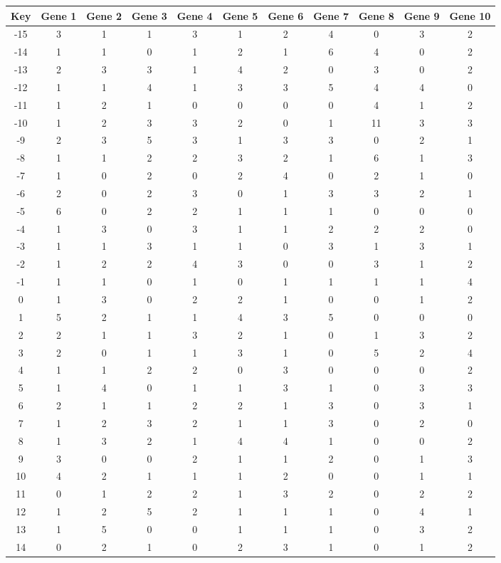 \begin{tabular}{|c|c|c|c|c|c|c|c|c|c|c|}
\hline
Key & Gene 1 & Gene 2 & Gene 3 & Gene 4 & Gene 5 & Gene 6 & Gene 7 & Gene 8 & Gene 9 & Gene 10 \\
\hline
-15 & 3 & 1 & 1 & 3 & 1 & 2 & 4 & 0 & 3 & 2 \\
-14 & 1 & 1 & 0 & 1 & 2 & 1 & 6 & 4 & 0 & 2 \\
-13 & 2 & 3 & 3 & 1 & 4 & 2 & 0 & 3 & 0 & 2 \\
-12 & 1 & 1 & 4 & 1 & 3 & 3 & 5 & 4 & 4 & 0 \\
-11 & 1 & 2 & 1 & 0 & 0 & 0 & 0 & 4 & 1 & 2 \\
-10 & 1 & 2 & 3 & 3 & 2 & 0 & 1 & 11 & 3 & 3 \\
-9 & 2 & 3 & 5 & 3 & 1 & 3 & 3 & 0 & 2 & 1 \\
-8 & 1 & 1 & 2 & 2 & 3 & 2 & 1 & 6 & 1 & 3 \\
-7 & 1 & 0 & 2 & 0 & 2 & 4 & 0 & 2 & 1 & 0 \\
-6 & 2 & 0 & 2 & 3 & 0 & 1 & 3 & 3 & 2 & 1 \\
-5 & 6 & 0 & 2 & 2 & 1 & 1 & 1 & 0 & 0 & 0 \\
-4 & 1 & 3 & 0 & 3 & 1 & 1 & 2 & 2 & 2 & 0 \\
-3 & 1 & 1 & 3 & 1 & 1 & 0 & 3 & 1 & 3 & 1 \\
-2 & 1 & 2 & 2 & 4 & 3 & 0 & 0 & 3 & 1 & 2 \\
-1 & 1 & 1 & 0 & 1 & 0 & 1 & 1 & 1 & 1 & 4 \\
0 & 1 & 3 & 0 & 2 & 2 & 1 & 0 & 0 & 1 & 2 \\
1 & 5 & 2 & 1 & 1 & 4 & 3 & 5 & 0 & 0 & 0 \\
2 & 2 & 1 & 1 & 3 & 2 & 1 & 0 & 1 & 3 & 2 \\
3 & 2 & 0 & 1 & 1 & 3 & 1 & 0 & 5 & 2 & 4 \\
4 & 1 & 1 & 2 & 2 & 0 & 3 & 0 & 0 & 0 & 2 \\
5 & 1 & 4 & 0 & 1 & 1 & 3 & 1 & 0 & 3 & 3 \\
6 & 2 & 1 & 1 & 2 & 2 & 1 & 3 & 0 & 3 & 1 \\
7 & 1 & 2 & 3 & 2 & 1 & 1 & 3 & 0 & 2 & 0 \\
8 & 1 & 3 & 2 & 1 & 4 & 4 & 1 & 0 & 0 & 2 \\
9 & 3 & 0 & 0 & 2 & 1 & 1 & 2 & 0 & 1 & 3 \\
10 & 4 & 2 & 1 & 1 & 1 & 2 & 0 & 0 & 1 & 1 \\
11 & 0 & 1 & 2 & 2 & 1 & 3 & 2 & 0 & 2 & 2 \\
12 & 1 & 2 & 5 & 2 & 1 & 1 & 1 & 0 & 4 & 1 \\
13 & 1 & 5 & 0 & 0 & 1 & 1 & 1 & 0 & 3 & 2 \\
14 & 0 & 2 & 1 & 0 & 2 & 3 & 1 & 0 & 1 & 2 \\
\hline
\end{tabular}